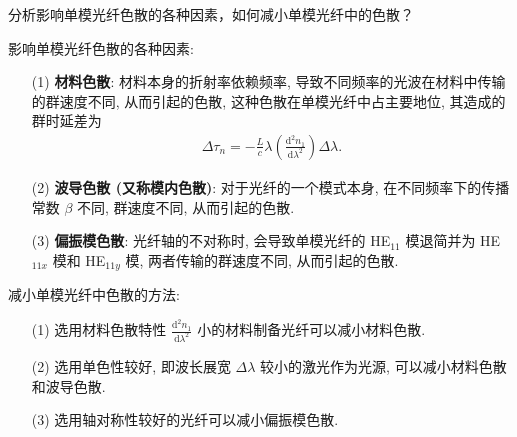 \documentclass{assignment}
\begin{document}
\begin{prob}
    分析影响单模光纤色散的各种因素，如何减小单模光纤中的色散？
\end{prob}
\begin{ans}
    影响单模光纤色散的各种因素:
    \begin{itemize}
        \item[(1)] \textbf{材料色散}: 材料本身的折射率依赖频率, 导致不同频率的光波在材料中传输的群速度不同, 从而引起的色散, 这种色散在单模光纤中占主要地位, 其造成的群时延差为
        \begin{align}
            \Delta\tau_n=-\frac{L}{c}\lambda\left(\frac{\mathrm{d}^2n_1}{\mathrm{d}\lambda^2}\right)\Delta\lambda.
        \end{align}
        \item[(2)] \textbf{波导色散 (又称模内色散)}: 对于光纤的一个模式本身, 在不同频率下的传播常数 $\beta$ 不同, 群速度不同, 从而引起的色散.
        \item[(3)] \textbf{偏振模色散}: 光纤轴的不对称时, 会导致单模光纤的 HE$_{11}$ 模退简并为 HE$_{11x}$ 模和 HE$_{11y}$ 模, 两者传输的群速度不同, 从而引起的色散.
    \end{itemize}

    减小单模光纤中色散的方法:
    \begin{itemize}
        \item[(1)] 选用材料色散特性 $\frac{\mathrm{d}^2n_1}{\mathrm{d}\lambda^2}$ 小的材料制备光纤可以减小材料色散.
        \item[(2)] 选用单色性较好, 即波长展宽 $\Delta\lambda$ 较小的激光作为光源, 可以减小材料色散和波导色散.
        \item[(3)] 选用轴对称性较好的光纤可以减小偏振模色散.
    \end{itemize}
\end{ans}
\end{document}
